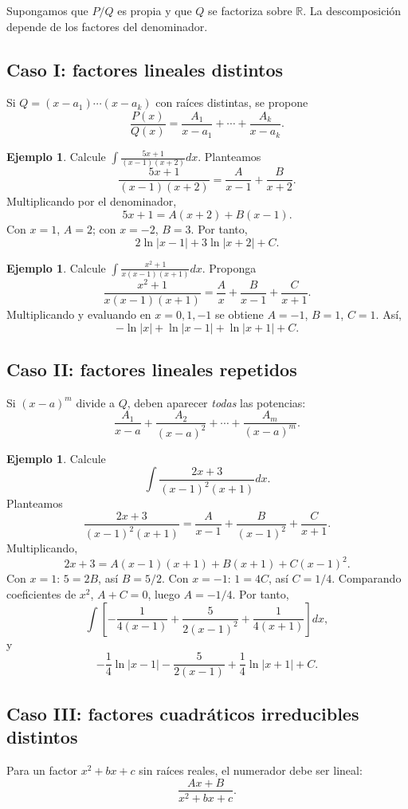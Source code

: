 \documentclass[12pt]{article}
\theoremstyle{definition}
\newtheorem{ejemplo}[teorema]{Ejemplo}
\theoremstyle{remark}
\newcommand{\R}{\mathbb{R}}
\begin{document}
Supongamos que $P/Q$ es propia y que $Q$ se factoriza sobre $\R$. La descomposición depende de los factores del denominador.
\subsection*{Caso I: factores lineales distintos}
Si $Q=(x-a_1)\cdots(x-a_k)$ con raíces distintas, se propone
\[\frac{P(x)}{Q(x)}=\frac{A_1}{x-a_1}+\cdots+\frac{A_k}{x-a_k}.\]

\begin{ejemplo}Calcule $\int\frac{5x+1}{(x-1)(x+2)}dx$. Planteamos
\[\frac{5x+1}{(x-1)(x+2)}=\frac{A}{x-1}+\frac{B}{x+2}.\]
Multiplicando por el denominador,
\[5x+1=A(x+2)+B(x-1).\]
Con $x=1$, $A=2$; con $x=-2$, $B=3$. Por tanto,
\[\boxed{2\ln|x-1|+3\ln|x+2|+C}.\]\end{ejemplo}

\begin{ejemplo}Calcule $\int\frac{x^2+1}{x(x-1)(x+1)}dx$. Proponga
\[\frac{x^2+1}{x(x-1)(x+1)}=\frac{A}{x}+\frac{B}{x-1}+\frac{C}{x+1}.\]
Multiplicando y evaluando en $x=0,1,-1$ se obtiene $A=-1$, $B=1$, $C=1$. Así,
\[\boxed{-\ln|x|+\ln|x-1|+\ln|x+1|+C}.\]\end{ejemplo}
\subsection*{Caso II: factores lineales repetidos}

Si $(x-a)^m$ divide a $Q$, deben aparecer \emph{todas} las potencias:
\[\frac{A_1}{x-a}+\frac{A_2}{(x-a)^2}+\cdots+\frac{A_m}{(x-a)^m}.\]

\begin{ejemplo}Calcule
\[\int\frac{2x+3}{(x-1)^2(x+1)}dx.\]
Planteamos
\[\frac{2x+3}{(x-1)^2(x+1)}=\frac{A}{x-1}+\frac{B}{(x-1)^2}+\frac{C}{x+1}.\]
Multiplicando,
\[2x+3=A(x-1)(x+1)+B(x+1)+C(x-1)^2.\]
Con $x=1$: $5=2B$, así $B=5/2$. Con $x=-1$: $1=4C$, así $C=1/4$. Comparando coeficientes de $x^2$, $A+C=0$, luego $A=-1/4$. Por tanto,
\[\int\left[-\frac1{4(x-1)}+\frac{5}{2(x-1)^2}+\frac1{4(x+1)}\right]dx,\]
y
\[\boxed{-\frac14\ln|x-1|-\frac{5}{2(x-1)}+\frac14\ln|x+1|+C}.\]\end{ejemplo}
\subsection*{Caso III: factores cuadráticos irreducibles distintos}
Para un factor $x^2+bx+c$ sin raíces reales, el numerador debe ser lineal:
\[\frac{Ax+B}{x^2+bx+c}.\]
\end{document}
